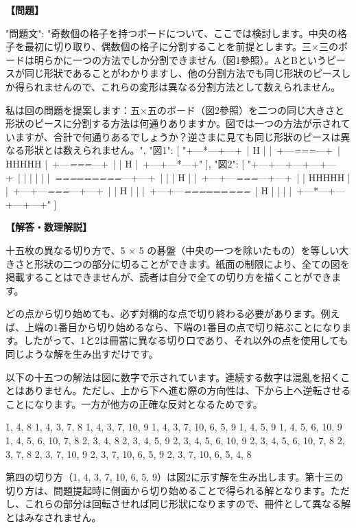 \documentclass[10pt,a4paper,oneside,openany]{ltjsbook}
\begin{document}
\begin{tcolorbox}[colback=softblue,colframe=primaryblue,title=\textbf{第 290 問：BOARDS WITH AN ODD NUMBER OF SQUARES.},arc=2mm,boxrule=1pt,breakable]
\textbf{【問題】}\par\vspace{0.3em}
{
    "問題文": "奇数個の格子を持つボードについて、ここでは検討します。中央の格子を最初に切り取り、偶数個の格子に分割することを前提とします。三×三のボードは明らかに一つの方法でしか分割できません（図1參照）。AとBというピースが同じ形狀であることがわかりますし、他の分割方法でも同じ形狀のピースしか得られませんので、これらの変形は異なる分割方法として数えられません。

私は回の問題を提案します：五×五のボード（図2參照）を二つの同じ大きさと形狀のピースに分割する方法は何通りありますか。図では一つの方法が示されていますが、合計で何通りあるでしょうか？逆さまに見ても同じ形狀のピースは異なる形狀とは数えられません。",
    "図1": [
        "+---*---+---+\
|   H   |   |\
+---\textit{===}---+\
|   HHHHH   |\
+---\textit{===}---+\
|   |   H   |\
+---+---*---+"
    ],
    "図2": [
        "+---+---+---+---+---+\
|   |   |   |   |   |\
\textit{===}===\textit{===}---+---+\
|   |   |   H   |   |\
+---+---\textit{===}---+---+\
|   |   HHHHH   |   |\
+---+---\textit{===}---+---+\
|   |   H   |   |   |\
+---+---\textit{===}===\textit{===}\
|   H   |   |   |   |\
+---*---+---+---+---+"
    ]
}
\tcblower
\textbf{【解答・数理解説】}\par\vspace{0.3em}
十五枚の異なる切り方で、5 × 5 の碁盤（中央の一つを除いたもの）を等しい大きさと形狀の二つの部分に切ることができます。紙面の制限により、全ての図を掲載することはできませんが、読者は自分で全ての切り方を描くことができます。

どの点から切り始めても、必ず対稱的な点で切り終わる必要があります。例えば、上端の1番目から切り始めるなら、下端の1番目の点で切り結ぶことになります。したがって、1と2は冊當に異なる切り口であり、それ以外の点を使用しても同じような解を生み出すだけです。

以下の十五つの解法は図に数字で示されています。連続する数字は混亂を招くことはありません。ただし、上から下へ進む際の方向性は、下から上へ逆転させることになります。一方が他方の正確な反対となるためです。

1, 4, 8
1, 4, 3, 7, 8
1, 4, 3, 7, 10, 9
1, 4, 3, 7, 10, 6, 5, 9
1, 4, 5, 9
1, 4, 5, 6, 10, 9
1, 4, 5, 6, 10, 7, 8
2, 3, 4, 8
2, 3, 4, 5, 9
2, 3, 4, 5, 6, 10, 9
2, 3, 4, 5, 6, 10, 7, 8
2, 3, 7, 8
2, 3, 7, 10, 9
2, 3, 7, 10, 6, 5, 9
2, 3, 7, 10, 6, 5, 4, 8

第四の切り方（1, 4, 3, 7, 10, 6, 5, 9）は図2に示す解を生み出します。第十三の切り方は、問題提起時に側面から切り始めることで得られる解となります。ただし、これらの部分は回転させれば同じ形狀になりますので、冊件として異なる解とはみなされません。
\end{tcolorbox}
\end{document}
